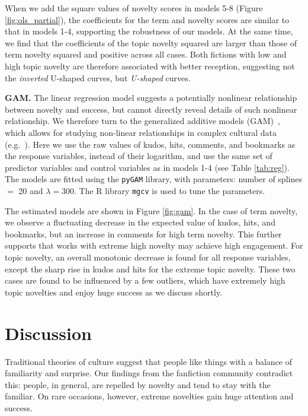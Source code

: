 \documentclass[letterpaper]{article} %
\begin{document}
When we add the square values of novelty scores in models 5-8 (Figure \ref{fig:ols_partial}), the coefficients for the term and novelty scores are similar to that in models 1-4, supporting the robustness of our models. At the same time, we find that the coefficients of the topic novelty squared are larger than those of term novelty squared and positive across all cases. Both fictions with low and high topic novelty are therefore associated with better reception, suggesting not the \emph{inverted} U-shaped curves, but \emph{U-shaped} curves.

\textbf{GAM.} The linear regression model suggests a potentially nonlinear relationship between novelty and success, but cannot directly reveal details of such nonlinear relationship. We therefore turn to the generalized additive models (GAM)~\cite{wood2006generalized}, which allows for studying non-linear relationships in complex cultural data (e.g.~\cite{horvat2018role}). Here we use the raw values of kudos, hits, comments, and bookmarks as the response variables, instead of their logarithm, and use the same set of predictor variables and control variables as in models 1-4 (see Table \ref{tab:reg}).
The models are fitted using the \texttt{pyGAM} library, with parameters: number of splines $=$ 20 and $\lambda = 300$. The R library \texttt{mgcv} is used to tune the parameters. 

The estimated models are shown in Figure \ref{fig:gam}. In the case of term novelty, we observe a fluctuating decrease in the expected value of kudos, hits, and bookmarks, but an increase in comments for high term novelty. This further supports that works with extreme high novelty may achieve high engagement. For topic novelty, an overall monotonic decrease is found for all response variables, except the sharp rise in kudos and hits for the extreme topic novelty. These two cases are found to be influenced by a few outliers, which have extremely high topic novelties and enjoy huge success as we discuss shortly. 


\section*{Discussion}
Traditional theories of culture suggest that people like things with a balance of familiarity and surprise. Our findings from the fanfiction community contradict this: people, in general, are repelled by  novelty and tend to stay with the familiar. On rare occasions, however, extreme novelties gain huge attention and success.
\end{document}
